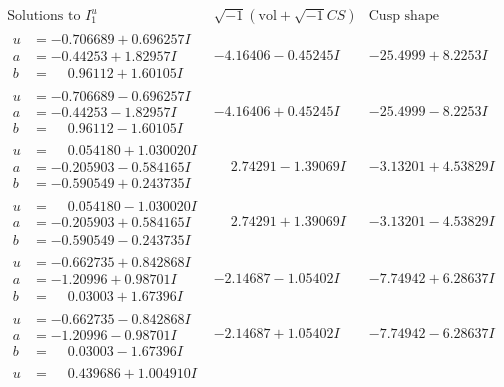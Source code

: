 \documentclass[1p]{elsarticle_modified}
\theoremstyle{definition}
\newcommand{\I}{\sqrt{-1}}
\begin{document}
$$\begin{array}{c|c|c}  
\text{Solutions to }I^u_{1}& \I (\text{vol} + \sqrt{-1}CS) & \text{Cusp shape}\\
 \hline 
\begin{aligned}
u &= -0.706689 + 0.696257 I \\
a &= -0.44253 + 1.82957 I \\
b &= \phantom{-}0.96112 + 1.60105 I\end{aligned}
 & -4.16406 - 0.45245 I & -25.4999 + 8.2253 I \\ \hline\begin{aligned}
u &= -0.706689 - 0.696257 I \\
a &= -0.44253 - 1.82957 I \\
b &= \phantom{-}0.96112 - 1.60105 I\end{aligned}
 & -4.16406 + 0.45245 I & -25.4999 - 8.2253 I \\ \hline\begin{aligned}
u &= \phantom{-}0.054180 + 1.030020 I \\
a &= -0.205903 - 0.584165 I \\
b &= -0.590549 + 0.243735 I\end{aligned}
 & \phantom{-}2.74291 - 1.39069 I & -3.13201 + 4.53829 I \\ \hline\begin{aligned}
u &= \phantom{-}0.054180 - 1.030020 I \\
a &= -0.205903 + 0.584165 I \\
b &= -0.590549 - 0.243735 I\end{aligned}
 & \phantom{-}2.74291 + 1.39069 I & -3.13201 - 4.53829 I \\ \hline\begin{aligned}
u &= -0.662735 + 0.842868 I \\
a &= -1.20996 + 0.98701 I \\
b &= \phantom{-}0.03003 + 1.67396 I\end{aligned}
 & -2.14687 - 1.05402 I & -7.74942 + 6.28637 I \\ \hline\begin{aligned}
u &= -0.662735 - 0.842868 I \\
a &= -1.20996 - 0.98701 I \\
b &= \phantom{-}0.03003 - 1.67396 I\end{aligned}
 & -2.14687 + 1.05402 I & -7.74942 - 6.28637 I \\ \hline\begin{aligned}
u &= \phantom{-}0.439686 + 1.004910 I \\

\end{aligned}
\end{array}$$
\end{document}
